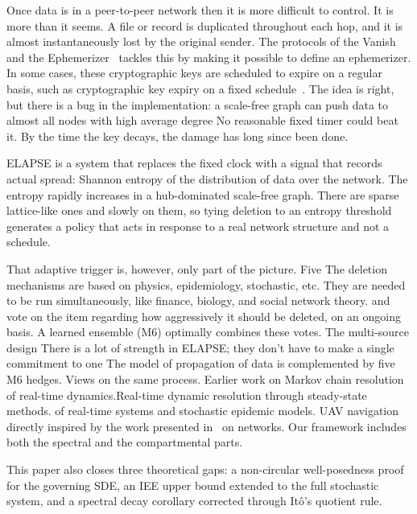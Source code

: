 \documentclass[conference]{IEEEtran}
\begin{document}
Once data is in a peer-to-peer network then it is more difficult to control.
It is more than it seems.  A file or record is duplicated throughout each hop,
and it is almost instantaneously lost by the original sender.
The protocols of the Vanish~\cite{geambasu2009vanish} and the
Ephemerizer~\cite{perlman2005ephemerizer} tackles this by making it possible to define an ephemerizer.
In some cases, these cryptographic keys are scheduled to expire on a regular basis, 
such as cryptographic key expiry on a fixed schedule~\cite{douceur2002sybil,tang2010fade}.
The idea is right, but there is a bug in the implementation: a scale-free graph
can push data to almost all nodes with high average degree
No reasonable fixed timer could beat it.  By the time
the key decays, the damage has long since been done.

ELAPSE is a system that replaces the fixed clock with a signal that records actual
spread: Shannon entropy of the distribution of data over the
network.  The entropy rapidly increases in a hub-dominated scale-free graph.
There are sparse lattice-like ones and slowly on them, so tying deletion to an
entropy threshold generates a policy that acts in response to a real network
structure and not a schedule.

That adaptive trigger is, however, only part of the picture.  Five
The deletion mechanisms are based on physics, epidemiology, stochastic, etc.
They are needed to be run simultaneously, like finance, biology, and social network theory.
and vote on the item regarding how aggressively it should be deleted, on an ongoing basis.  A learned
ensemble (M6) optimally combines these votes.  The multi-source design
There is a lot of strength in ELAPSE; they don't have to make a single commitment to one
The model of propagation of data is complemented by five M6 hedges.
Views on the same process.  Earlier work on Markov chain
resolution of real-time dynamics.Real-time dynamic resolution through steady-state methods.
of real-time systems \cite{mohan2025realtime} and stochastic epidemic models.
UAV navigation directly inspired by the work presented in~\cite{sailaja2025stochastic} on networks.
Our framework includes both the spectral and the compartmental parts.

This paper also closes three theoretical gaps: a non-circular
well-posedness proof for the governing SDE, an IEE upper bound
extended to the full stochastic system, and a spectral decay
corollary corrected through It\^{o}'s quotient rule.

\end{document}
